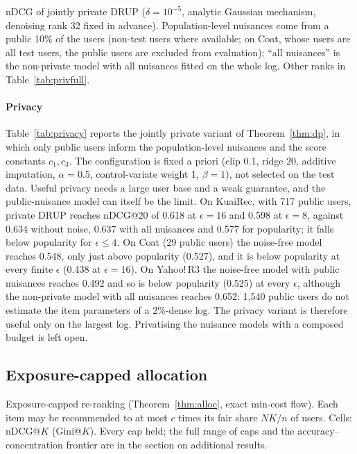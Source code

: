\documentclass[preprint,review,12pt,authoryear]{elsarticle}
\theoremstyle{definition}
\begin{document}
\begin{table}[t]\centering\small
\caption{nDCG of jointly private DRUP ($\delta=10^{-5}$, analytic Gaussian mechanism,
denoising rank 32 fixed in advance). Population-level nuisances come from a
public 10\% of the users (non-test users where available; on Coat, whose
users are all test users, the public users are excluded from evaluation); ``all nuisances'' is the non-private model
with all nuisances fitted on the whole log. Other ranks in
Table~\ref{tab:privfull}.}\label{tab:privacy}
\begin{adjustbox}{max width=\textwidth}

\end{adjustbox}
\end{table}

\paragraph{Privacy} Table~\ref{tab:privacy} reports the jointly private variant of
Theorem~\ref{thm:dp}, in which only public users inform the population-level
nuisances and the score constants $c_1,c_3$. The configuration is fixed a
priori (clip 0.1, ridge 20, additive imputation, $\alpha=0.5$, control-variate
weight 1, $\beta=1$), not selected on the test data. Useful privacy needs a large
user base and a weak guarantee, and the public-nuisance model can itself be the
limit. On KuaiRec, with 717 public users, private DRUP reaches nDCG@20 of 0.618
at $\epsilon=16$ and 0.598 at $\epsilon=8$, against 0.634 without noise, 0.637
with all nuisances and 0.577 for popularity; it falls below popularity for
$\epsilon\le4$. On Coat (29 public users) the noise-free model reaches 0.548,
only just above popularity (0.527), and it is below popularity at every finite
$\epsilon$ (0.438 at $\epsilon=16$). On Yahoo!\,R3 the noise-free model with
public nuisances reaches 0.492 and so is below popularity (0.525) at every
$\epsilon$, although the non-private model with all nuisances reaches 0.652:
1{,}540 public users do not estimate the item parameters of a 2\%-dense log. The
privacy variant is therefore useful only on the largest log. Privatising the
nuisance models with a composed budget is left open.

\subsection{Exposure-capped allocation}\label{sec:rerank}

\begin{table}[t]\centering\small
\caption{Exposure-capped re-ranking (Theorem~\ref{thm:alloc}, exact min-cost flow).
Each item may be recommended to at most $c$ times its fair share $NK/n$ of users.
Cells: nDCG@$K$ (Gini@$K$). Every cap held; the full range of caps and the
accuracy--concentration frontier are in the section on additional results.}\label{tab:rerank}
\begin{adjustbox}{max width=\textwidth}

\end{adjustbox}
\end{table}
\end{document}
